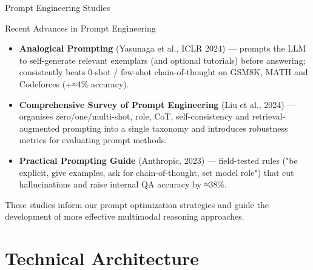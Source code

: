 \documentclass[aspectratio=169,xcolor=dvipsnames]{beamer}
\begin{document}
\begin{frame}{Prompt Engineering Studies}
    \begin{block}{Recent Advances in Prompt Engineering}
        \begin{itemize}
            \item \textbf{Analogical Prompting} (Yasunaga et al., ICLR 2024) — prompts the LLM to self-generate relevant exemplars (and optional tutorials) before answering; consistently beats 0-shot / few-shot chain-of-thought on GSM8K, MATH and Codeforces (+≈4\% accuracy).
            
            \item \textbf{Comprehensive Survey of Prompt Engineering} (Liu et al., 2024) — organises zero/one/multi-shot, role, CoT, self-consistency and retrieval-augmented prompting into a single taxonomy and introduces robustness metrics for evaluating prompt methods.
            
            \item \textbf{Practical Prompting Guide} (Anthropic, 2023) — field-tested rules ("be explicit, give examples, ask for chain-of-thought, set model role") that cut hallucinations and raise internal QA accuracy by ≈38\%.
        \end{itemize}
    \end{block}
    
    \vspace{0.3cm}
    \begin{center}
        \small{These studies inform our prompt optimization strategies and guide the development of more effective multimodal reasoning approaches.}
    \end{center}
\end{frame}

\section{Technical Architecture}
\end{document}
